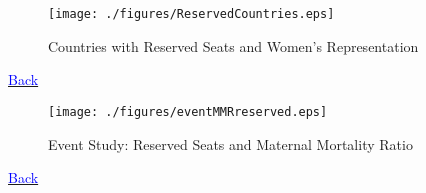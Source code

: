 \documentclass[10pt,letterpaper,subeqn]{beamer}
\begin{document}
\begin{frame}[label=quotaCover]
  \begin{figure}
    \caption{Countries with Reserved Seats and Women's Representation}
    \texttt{[image: ./figures/ReservedCountries.eps]}
  \end{figure}
  \hyperlink{Quotas}{{\footnotesize \textcolor{blue}{Back}}}
\end{frame}

\begin{frame}[label=quotalnMMR]
  \begin{figure}
    \caption{Event Study: Reserved Seats and Maternal Mortality Ratio}
    \texttt{[image: ./figures/eventMMRreserved.eps]}
  \end{figure}
  \hyperlink{quotaMMR}{{\footnotesize \textcolor{blue}{Back}}}
\end{frame}
\end{document}
